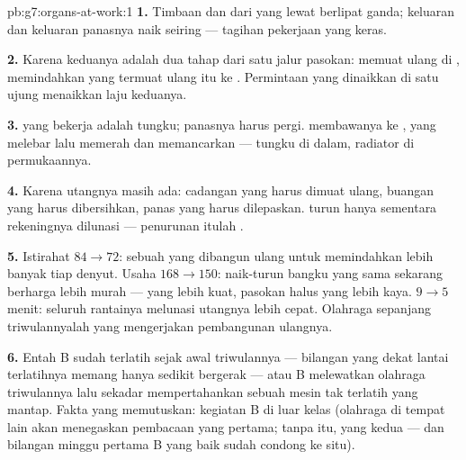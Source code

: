 \begin{solution}{pb:g7:organs-at-work:1}
\textbf{1.} Timbaan  dan  dari  yang lewat
berlipat ganda; keluaran  dan keluaran panasnya naik
seiring --- tagihan pekerjaan yang keras.

\textbf{2.} Karena keduanya adalah dua tahap dari satu jalur pasokan:
 memuat ulang  di ,  memindahkan
 yang termuat ulang itu ke . Permintaan yang dinaikkan di
satu ujung menaikkan laju keduanya.

\textbf{3.}  yang bekerja adalah tungku; panasnya harus pergi.
 membawanya ke , yang  melebar lalu memerah
dan memancarkan --- tungku di dalam, radiator di permukaannya.

\textbf{4.} Karena utangnya masih ada: cadangan  yang harus
dimuat ulang, buangan yang harus dibersihkan, panas yang harus
dilepaskan.  turun hanya sementara rekeningnya dilunasi
--- penurunan itulah .

\textbf{5.} Istirahat $84 \to 72$: sebuah  yang dibangun ulang
untuk memindahkan lebih banyak tiap denyut. Usaha $168 \to 150$:
naik-turun bangku yang sama sekarang berharga lebih murah --- 
yang lebih kuat, pasokan  halus yang lebih kaya. 
$9 \to 5$ menit: seluruh rantainya melunasi utangnya lebih cepat.
Olahraga sepanjang triwulannyalah yang mengerjakan pembangunan
ulangnya.

\textbf{6.} Entah B sudah terlatih sejak awal triwulannya ---
bilangan yang dekat lantai terlatihnya memang hanya sedikit bergerak
--- atau B melewatkan olahraga triwulannya lalu sekadar
mempertahankan sebuah mesin tak terlatih yang mantap. Fakta yang
memutuskan: kegiatan B di luar kelas (olahraga di tempat lain akan
menegaskan pembacaan yang pertama; tanpa itu, yang kedua --- dan
bilangan minggu pertama B yang baik sudah condong ke situ).


\end{solution}
